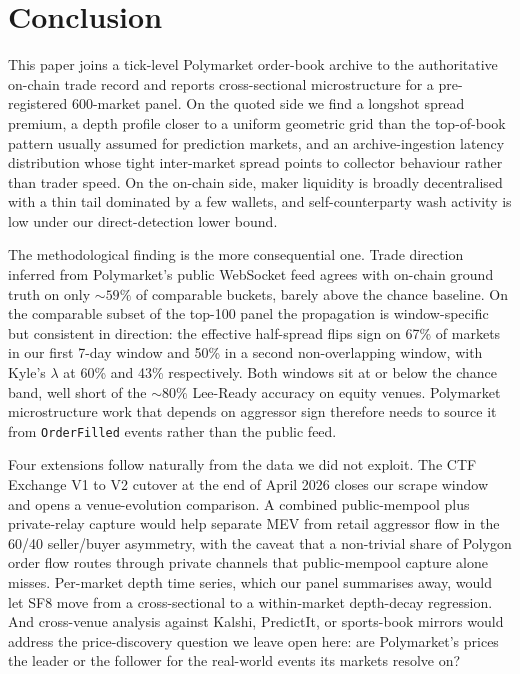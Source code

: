 \section{Conclusion}\label{sec:conclusion}

This paper joins a tick-level Polymarket order-book archive to the
authoritative on-chain trade record and reports cross-sectional
microstructure for a pre-registered 600-market panel. On the quoted
side we find a longshot spread premium, a depth profile closer to a
uniform geometric grid than the top-of-book pattern usually assumed
for prediction markets, and an archive-ingestion latency distribution
whose tight inter-market spread points to collector behaviour rather
than trader speed. On the on-chain side, maker liquidity is broadly
decentralised with a thin tail dominated by a few wallets, and
self-counterparty wash activity is low under our direct-detection
lower bound.

The methodological finding is the more consequential one. Trade
direction inferred from Polymarket's public WebSocket feed agrees with
on-chain ground truth on only $\sim 59\%$ of comparable buckets,
barely above the chance baseline. On the comparable subset of the
top-100 panel the propagation is window-specific but consistent in
direction: the effective half-spread flips sign on 67\% of markets
in our first 7-day window and 50\% in a second non-overlapping
window, with Kyle's $\lambda$ at 60\% and 43\% respectively. Both
windows sit at or below the chance band, well short of the
$\sim 80\%$ Lee-Ready accuracy on equity venues. Polymarket
microstructure work that depends on aggressor sign therefore needs
to source it from \texttt{OrderFilled} events rather than the public
feed.

Four extensions follow naturally from the data we did not exploit.
The CTF Exchange V1 to V2 cutover at the end of April 2026 closes our
scrape window and opens a venue-evolution comparison. A combined
public-mempool plus private-relay capture would help separate MEV
from retail aggressor flow in the 60/40 seller/buyer asymmetry, with
the caveat that a non-trivial share of Polygon order flow routes
through private channels that public-mempool capture alone misses. Per-market depth time series,
which our panel summarises away, would let SF8 move from a
cross-sectional to a within-market depth-decay regression. And
cross-venue analysis against Kalshi, PredictIt, or sports-book
mirrors would address the price-discovery question we leave open
here: are Polymarket's prices the leader or the follower for the
real-world events its markets resolve on?
